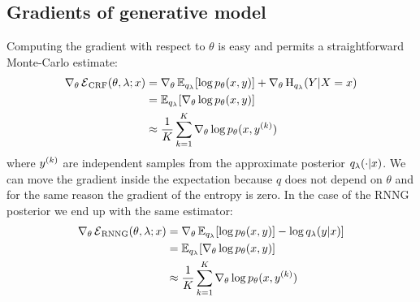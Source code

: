   \subsection{Gradients of generative model}
    Computing the gradient with respect to $\theta$ is easy and permits a straightforward Monte-Carlo estimate:
    \begin{align}
      \nabla_{\theta} \operatorname{\mathcal{E}}_{\text{CRF}}(\theta, \lambda; x)
        &= \nabla_{\theta} \operatorname{\mathbb{E}}_{q_{\lambda}} [ \log p_{\theta}(x, y) ]  + \nabla_{\theta} \operatorname{H}_{q_{\lambda}}( Y | X = x)  \nonumber \\
        &= \operatorname{\mathbb{E}}_{q_{\lambda}} [ \nabla_{\theta} \log p_{\theta}(x, y) ]  \nonumber \\
        &\approx \frac{1}{K}\sum_{k=1}^K  \nabla_{\theta} \log p_{\theta}(x, y^{(k)})
    \end{align}
    where $y^{(k)}$ are independent samples from the approximate posterior $q_{\lambda}( \cdot | x)$. We can move the gradient inside the expectation because $q$ does not depend on $\theta$ and for the same reason the gradient of the entropy is zero. In the case of the RNNG posterior we end up with the same estimator:
    \begin{align}
      \nabla_{\theta} \operatorname{\mathcal{E}}_{\text{RNNG}}(\theta, \lambda; x)
        &= \nabla_{\theta} \operatorname{\mathbb{E}}_{q_{\lambda}} [ \log p_{\theta}(x, y) ]  - \log q_{\lambda}(y | x) ]  \nonumber \\
        &= \operatorname{\mathbb{E}}_{q_{\lambda}} [ \nabla_{\theta} \log p_{\theta}(x, y) ]  \nonumber \\
        &\approx \frac{1}{K}\sum_{k=1}^K  \nabla_{\theta} \log p_{\theta}(x, y^{(k)})
    \end{align}

